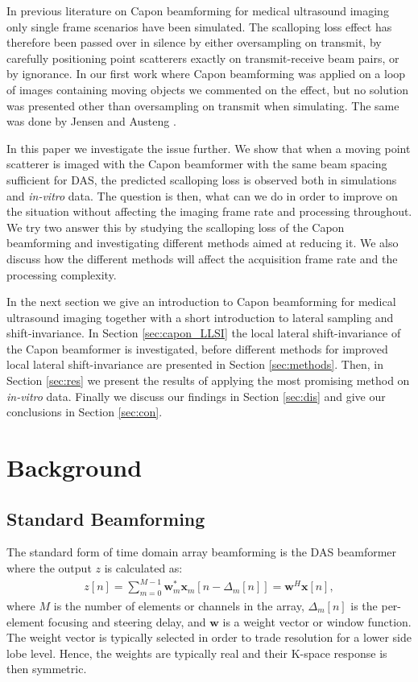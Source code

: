 \documentclass[journal]{IEEEtran}
\renewcommand{\vec}[1]{\mathbf{#1}}
\newcommand\comment[1]{\textit{{\color{red}(#1)}}}
\begin{document}
In previous literature on Capon beamforming for medical ultrasound imaging only single frame scenarios have been simulated. The scalloping loss effect has therefore been passed over in silence by either oversampling on transmit, by carefully positioning point scatterers exactly on transmit-receive beam pairs, or by ignorance. In our first work where Capon beamforming was applied on a loop of images containing moving objects \cite{Asen2012, Asen} we commented on the effect, but no solution was presented other than oversampling on transmit when simulating. The same was done by Jensen and Austeng \cite{Jensen2012}.

In this paper we investigate the issue further. We show that when a moving point scatterer is imaged with the Capon beamformer with the same beam spacing sufficient for DAS, the predicted scalloping loss is observed both in simulations and \textit{in-vitro} data. The question is then, what can we do in order to improve on the situation without affecting the imaging frame rate and processing throughout. We try two answer this by studying the scalloping loss of the Capon beamforming and investigating different methods aimed at reducing it. We also discuss how the different methods will affect the acquisition frame rate and the processing complexity. 

In the next section we give an introduction to Capon beamforming for medical ultrasound imaging together with a short introduction to lateral sampling and shift-invariance. In Section \ref{sec:capon_LLSI} the local lateral shift-invariance of the Capon beamformer is investigated, before different methods for improved local lateral shift-invariance are presented in Section \ref{sec:methods}. Then, in Section \ref{sec:res} we present the results of applying the most promising method on \textit{in-vitro} data. Finally we discuss our findings in Section \ref{sec:dis} and give our conclusions in Section \ref{sec:con}.



\section{Background}
\subsection{Standard Beamforming}
The standard form of time domain array beamforming is the DAS beamformer where the output $z$ is calculated as:
\begin{align}\label{eq:das}
z[n] = \sum_{m = 0}^{M-1}\vec{w}_m^*\vec{x}_m[n - \Delta_m[n]] = \vec{w}^H\vec{x}[n],
\end{align}
where $M$ is the number of elements or channels in the array, $\Delta_m[n]$ is the per-element focusing and steering delay, and $\vec{w}$ is a weight vector or window function. The weight vector is typically selected in order to trade resolution for a lower side lobe level. Hence, the weights are typically real and their K-space response is then symmetric.
\end{document}
